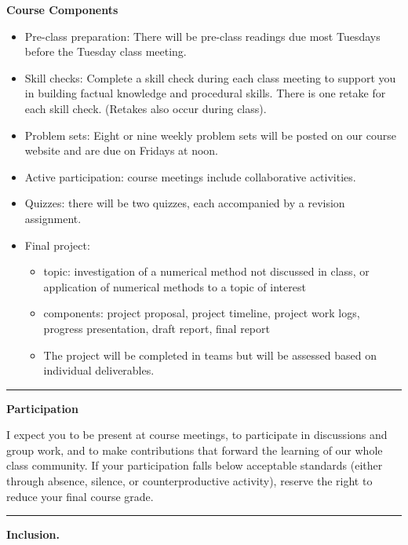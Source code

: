 \documentclass[12pt,letterpaper]{exam}
\begin{document}
\noindent\textbf{Course Components}

\begin{itemize}
\itemsep0pt
    \item Pre-class preparation:  There will be pre-class readings due most Tuesdays before the Tuesday class meeting.
    \item Skill checks: Complete a skill check during each class meeting to support you in building factual knowledge and procedural skills.  There is one retake for each skill check.  (Retakes also occur during class).
    \item Problem sets: Eight or nine weekly problem sets will be posted on our course website and are due on Fridays at noon.
    \item Active participation:  course meetings include collaborative activities.
    \item Quizzes: there will be two quizzes, each accompanied by a revision assignment. 
    \item Final project: 
    \begin{itemize}
    \itemsep0pt
        \item topic: investigation of a numerical method not discussed in class, or application of numerical methods to a topic of interest
        \item components: project proposal, project timeline, project work logs, progress presentation, draft report, final report
        \item The project will be completed in teams but will be assessed based on individual deliverables.
    \end{itemize}
\end{itemize}

\hrule
\vspace{0.5cm}

\noindent\textbf{Participation}

I expect you to be present at course meetings, to participate in discussions and group work, and to make contributions that forward the learning of our whole class community. If your participation falls below acceptable standards (either through absence, silence, or counterproductive activity),  reserve the right to reduce your final course grade.  

\vspace{0.5cm}
\hrule
\vspace{0.5cm}

\noindent\textbf{Inclusion.}
\end{document}
